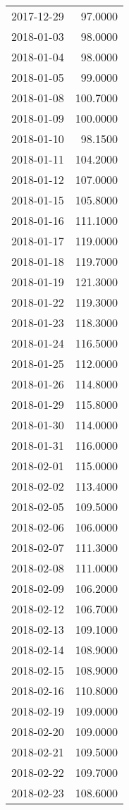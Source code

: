 \begin{tabular}{lr}
2017-12-29 &     97.0000 \\
2018-01-03 &     98.0000 \\
2018-01-04 &     98.0000 \\
2018-01-05 &     99.0000 \\
2018-01-08 &    100.7000 \\
2018-01-09 &    100.0000 \\
2018-01-10 &     98.1500 \\
2018-01-11 &    104.2000 \\
2018-01-12 &    107.0000 \\
2018-01-15 &    105.8000 \\
2018-01-16 &    111.1000 \\
2018-01-17 &    119.0000 \\
2018-01-18 &    119.7000 \\
2018-01-19 &    121.3000 \\
2018-01-22 &    119.3000 \\
2018-01-23 &    118.3000 \\
2018-01-24 &    116.5000 \\
2018-01-25 &    112.0000 \\
2018-01-26 &    114.8000 \\
2018-01-29 &    115.8000 \\
2018-01-30 &    114.0000 \\
2018-01-31 &    116.0000 \\
2018-02-01 &    115.0000 \\
2018-02-02 &    113.4000 \\
2018-02-05 &    109.5000 \\
2018-02-06 &    106.0000 \\
2018-02-07 &    111.3000 \\
2018-02-08 &    111.0000 \\
2018-02-09 &    106.2000 \\
2018-02-12 &    106.7000 \\
2018-02-13 &    109.1000 \\
2018-02-14 &    108.9000 \\
2018-02-15 &    108.9000 \\
2018-02-16 &    110.8000 \\
2018-02-19 &    109.0000 \\
2018-02-20 &    109.0000 \\
2018-02-21 &    109.5000 \\
2018-02-22 &    109.7000 \\
2018-02-23 &    108.6000 \\

\end{tabular}
